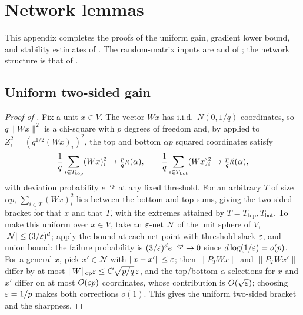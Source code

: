 \section{Network lemmas}\label{app:netlemmas}

This appendix completes the proofs of the uniform gain, gradient lower bound, and stability estimates of
. The random-matrix inputs are  and  of
; the network structure is that of .

\subsection{Uniform two-sided gain}
\begin{proof}[Proof of ]
Fix a unit $x\in V$. The vector $Wx$ has i.i.d.\ $N(0,1/q)$ coordinates, so $q\|Wx\|^2$ is a
chi-square with $p$ degrees of freedom and, by  applied to $Z_i^2=(q^{1/2}(Wx)_i)^2$,
the top and bottom $\alpha p$ squared coordinates satisfy
\[
  \frac1q\sum_{i\in T_{\mathrm{top}}}(Wx)_i^2\to\tfrac pq\kappa(\alpha),\qquad
  \frac1q\sum_{i\in T_{\mathrm{bot}}}(Wx)_i^2\to\tfrac pq\check{\kappa}(\alpha),
\]
with deviation probability $e^{-cp}$ at any fixed threshold. For an arbitrary $T$ of size $\alpha p$,
$\sum_{i\in T}(Wx)_i^2$ lies between the bottom and top sums, giving the two-sided bracket for that $x$
and that $T$, with the extremes attained by $T=T_{\mathrm{top}},T_{\mathrm{bot}}$. To make this uniform
over $x\in V$, take an $\varepsilon$-net $\mathcal N$ of the unit sphere of $V$, $|\mathcal N|\le(3/\varepsilon)^d$;
apply the bound at each net point with threshold slack $\varepsilon$, and union bound: the failure probability
is $(3/\varepsilon)^d e^{-cp}\to0$ since $d\log(1/\varepsilon)=o(p)$. For a general $x$, pick $x'\in\mathcal N$ with
$\|x-x'\|\le\varepsilon$; then $\|P_TWx\|$ and $\|P_TWx'\|$ differ by at most $\|W\|_{\mathrm{op}}\varepsilon\le C\sqrt{p/q}\,\varepsilon$,
and the top/bottom-$\alpha$ selections for $x$ and $x'$ differ on at most $O(\varepsilon p)$ coordinates, whose
contribution is $O(\sqrt{\varepsilon})$; choosing $\varepsilon=1/p$ makes both corrections $o(1)$. This gives the
uniform two-sided bracket and the sharpness.
\end{proof}


